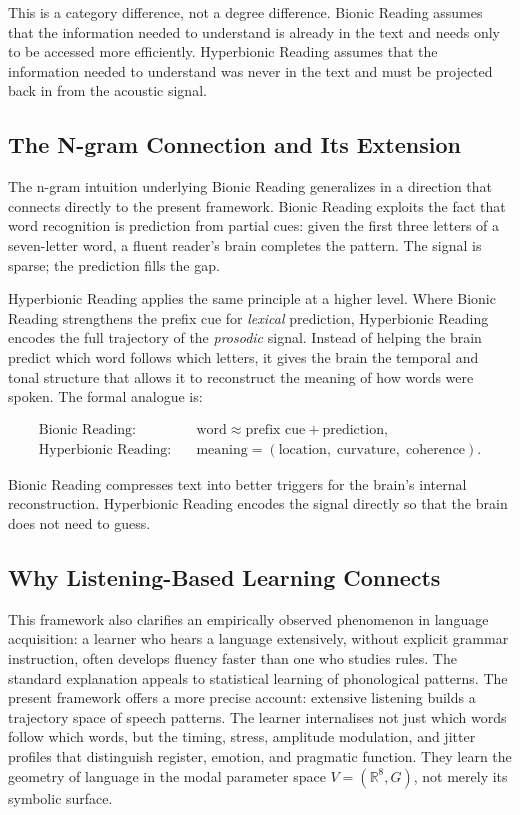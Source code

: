 \documentclass[12pt, a4paper]{article}
\begin{document}
This is a category difference, not a degree difference. Bionic Reading assumes that the information needed to understand is already in the text and needs only to be accessed more efficiently. Hyperbionic Reading assumes that the information needed to understand was never in the text and must be projected back in from the acoustic signal.

\subsection{The N-gram Connection and Its Extension}

The n-gram intuition underlying Bionic Reading generalizes in a direction that connects directly to the present framework. Bionic Reading exploits the fact that word recognition is prediction from partial cues: given the first three letters of a seven-letter word, a fluent reader's brain completes the pattern. The signal is sparse; the prediction fills the gap.

Hyperbionic Reading applies the same principle at a higher level. Where Bionic Reading strengthens the prefix cue for \emph{lexical} prediction, Hyperbionic Reading encodes the full trajectory of the \emph{prosodic} signal. Instead of helping the brain predict which word follows which letters, it gives the brain the temporal and tonal structure that allows it to reconstruct the meaning of how words were spoken. The formal analogue is:

\begin{align}
\text{Bionic Reading:} & \quad \text{word} \approx \text{prefix cue} + \text{prediction}, \label{eq:bionic_formal}\\
\text{Hyperbionic Reading:} & \quad \text{meaning} = (\text{location},\; \text{curvature},\; \text{coherence}). \label{eq:hyperbionic_formal}
\end{align}

Bionic Reading compresses text into better triggers for the brain's internal reconstruction. Hyperbionic Reading encodes the signal directly so that the brain does not need to guess.

\subsection{Why Listening-Based Learning Connects}

This framework also clarifies an empirically observed phenomenon in language acquisition: a learner who hears a language extensively, without explicit grammar instruction, often develops fluency faster than one who studies rules. The standard explanation appeals to statistical learning of phonological patterns. The present framework offers a more precise account: extensive listening builds a trajectory space of speech patterns. The learner internalises not just which words follow which words, but the timing, stress, amplitude modulation, and jitter profiles that distinguish register, emotion, and pragmatic function. They learn the geometry of language in the modal parameter space $V = (\mathbb{R}^8, G)$, not merely its symbolic surface.
\end{document}
